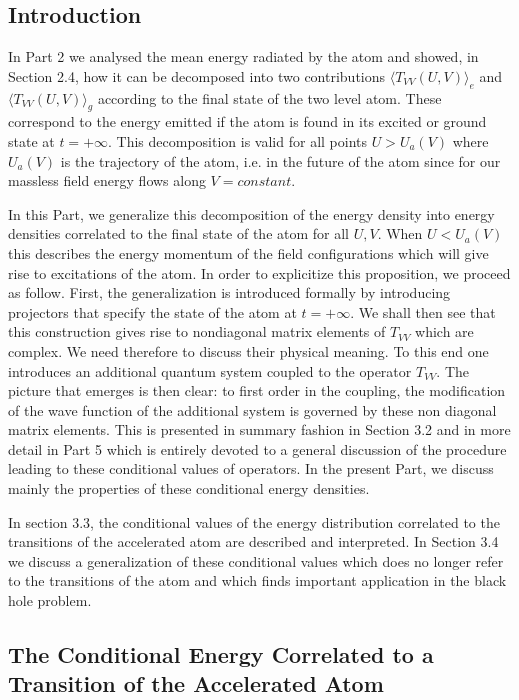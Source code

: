 \subsection{Introduction}\label{deco}

 In Part 2 we analysed the mean energy radiated by
the atom and showed, in Section 2.4,
how it can be
decomposed into two contributions $\langle T_{VV}(U,V)
\rangle _e$ and $\langle T_{VV}(U,V) \rangle _g$ according
to the final state of the two level atom. These correspond
to the energy emitted if the atom is found in its excited
or ground state at $t=+\infty$. This decomposition is valid
for all points $U>U_a(V)$ where $U_a(V)$ is the trajectory
of the atom, i.e. in the future of the atom since for our massless
field energy flows along $V=constant$.

In this
Part, we generalize this decomposition of the energy
density into energy densities
correlated to the final state of the atom
for all $U,V$.
When $U<U_a(V) $
this describes the energy momentum of the field
configurations
which will give rise to
excitations of the
atom. In order to explicitize this proposition,
we proceed as follow. First, the generalization is introduced formally by
introducing projectors that specify the state of the atom
at $t=+\infty$. We shall then see that this construction gives rise to
nondiagonal matrix elements of $T_{VV}$ which are complex.
We need therefore to discuss their physical meaning.
To this end one
introduces an additional quantum system coupled to the operator
$T_{VV}$. The picture that emerges is then clear: to first order
in the coupling, the modification of the wave function of the additional
system is governed by these non diagonal matrix elements.
This is presented in summary fashion
in Section 3.2 and in more detail in Part 5 which is entirely
devoted to a general discussion of the procedure leading to
these conditional values of operators.
In the present Part, we discuss mainly the properties of these conditional
 energy densities.

In section 3.3, the conditional values of the
energy distribution correlated to the transitions of the accelerated atom
are described and interpreted. In Section 3.4 we
discuss a generalization of these conditional values
which does no longer refer to the transitions of the atom
and  which finds important application in the black hole
problem.

\subsection{The Conditional Energy Correlated to a Transition of the
Accelerated Atom}\label{conddec}

